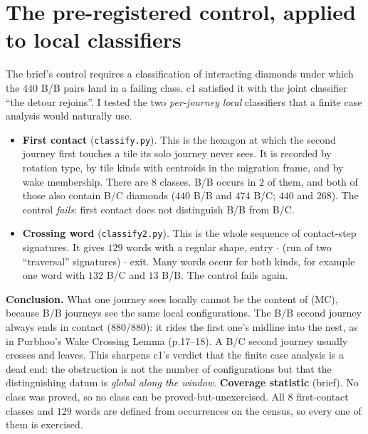 \documentclass[11pt]{article}
\theoremstyle{definition}
\begin{document}
\section{The pre-registered control, applied to local classifiers}\label{sec:control}
The brief's control requires a classification of interacting diamonds under which the $440$ B/B pairs land in a failing class.
c1 satisfied it with the joint classifier ``the detour rejoins''. I tested the two \emph{per-journey local} classifiers that a
finite case analysis would naturally use.
\begin{itemize}
\item \textbf{First contact} (\texttt{classify.py}). This is the hexagon at which the second journey first touches a tile its solo
journey never sees. It is recorded by rotation type, by tile kinds with centroids in the migration frame, and by wake membership.
There are $8$ classes. B/B occurs in $2$ of them, and both of those also contain B/C diamonds ($440$ B/B and $474$ B/C; $440$ and $268$). The control
\emph{fails}: first contact does not distinguish B/B from B/C.
\item \textbf{Crossing word} (\texttt{classify2.py}). This is the whole sequence of contact-step signatures. It gives $129$ words with a
regular shape, entry $\cdot$ (run of two ``traversal'' signatures) $\cdot$ exit. Many words occur for both kinds, for example one word
with $132$ B/C and $13$ B/B. The control fails again.
\end{itemize}
\textbf{Conclusion.} What one journey sees locally cannot be the content of (MC), because B/B journeys see the same local
configurations. The B/B second journey always ends in contact ($880/880$): it rides the first one's midline into the nest, as in
Purbhoo's Wake Crossing Lemma (p.17--18). A B/C second journey usually crosses and leaves. This sharpens c1's verdict that the
finite case analysis is a dead end: the obstruction is not the number of configurations but that the distinguishing datum is
\emph{global along the window}. \textbf{Coverage statistic} (brief). No class was proved, so no class can be proved-but-unexercised. All $8$ first-contact
classes and $129$ words are defined from occurrences on the census, so every one of them is exercised.
\end{document}
